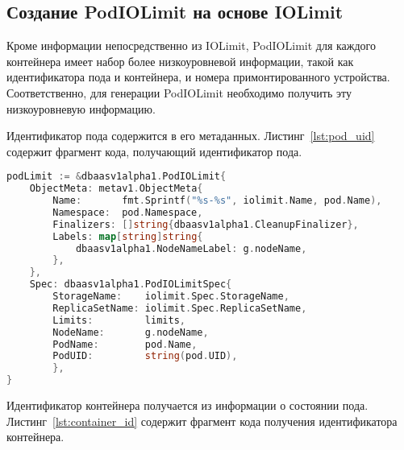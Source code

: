 \subsection{Создание PodIOLimit на основе IOLimit}

Кроме информации непосредственно из IOLimit, PodIOLimit для каждого контейнера имеет набор более низкоуровневой информации, такой как идентификатора пода и контейнера, и номера примонтированного устройства. Соответственно, для генерации PodIOLimit необходимо получить эту низкоуровневую информацию.

Идентификатор пода содержится в его метаданных. Листинг~\ref{lst:pod_uid} содержит фрагмент кода, получающий идентификатор пода.

\begin{lstlisting}[language=Go,label=lst:pod_uid, caption={Получение идентификатора пода}]
podLimit := &dbaasv1alpha1.PodIOLimit{
	ObjectMeta: metav1.ObjectMeta{
		Name:       fmt.Sprintf("%s-%s", iolimit.Name, pod.Name),
		Namespace:  pod.Namespace,
		Finalizers: []string{dbaasv1alpha1.CleanupFinalizer},
		Labels: map[string]string{
			dbaasv1alpha1.NodeNameLabel: g.nodeName,
		},
	},
	Spec: dbaasv1alpha1.PodIOLimitSpec{
		StorageName:    iolimit.Spec.StorageName,
		ReplicaSetName: iolimit.Spec.ReplicaSetName,
		Limits:         limits,
		NodeName:       g.nodeName,
		PodName:        pod.Name,
		PodUID:         string(pod.UID),
		},
}
\end{lstlisting}

Идентификатор контейнера получается из информации о состоянии пода. Листинг~\ref{lst:container_id} содержит фрагмент кода получения идентификатора контейнера.

